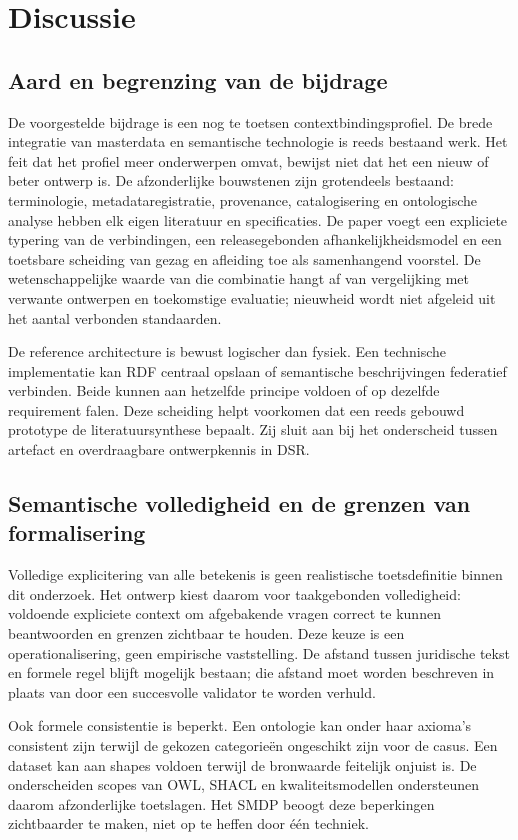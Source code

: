 \section{Discussie}
\subsection{Aard en begrenzing van de bijdrage}
De voorgestelde bijdrage is een nog te toetsen contextbindingsprofiel. De brede integratie van masterdata en semantische technologie is reeds bestaand werk. \citep{L18} Het feit dat het profiel meer onderwerpen omvat, bewijst niet dat het een nieuw of beter ontwerp is. De afzonderlijke bouwstenen zijn grotendeels bestaand: terminologie, metadata\-registratie, provenance, catalogisering en ontologische analyse hebben elk eigen literatuur en specificaties. \citep{S11,S08,S33,S47,L08} De paper voegt een expliciete typering van de verbindingen, een releasegebonden afhankelijkheidsmodel en een toetsbare scheiding van gezag en afleiding toe als samenhangend voorstel. De wetenschappelijke waarde van die combinatie hangt af van vergelijking met verwante ontwerpen en toekomstige evaluatie; nieuwheid wordt niet afgeleid uit het aantal verbonden standaarden.

De reference architecture is bewust logischer dan fysiek. Een technische implementatie kan RDF centraal opslaan of semantische beschrijvingen federatief verbinden. Beide kunnen aan hetzelfde principe voldoen of op dezelfde requirement falen. Deze scheiding helpt voorkomen dat een reeds gebouwd prototype de literatuursynthese bepaalt. Zij sluit aan bij het onderscheid tussen artefact en overdraagbare ontwerpkennis in DSR. \citep{L04}

\subsection{Semantische volledigheid en de grenzen van formalisering}
Volledige explicitering van alle betekenis is geen realistische toetsdefinitie binnen dit onderzoek. Het ontwerp kiest daarom voor taakgebonden volledigheid: voldoende expliciete context om afgebakende vragen correct te kunnen beantwoorden en grenzen zichtbaar te houden. Deze keuze is een operationalisering, geen empirische vaststelling. De afstand tussen juridische tekst en formele regel blijft mogelijk bestaan; die afstand moet worden beschreven in plaats van door een succesvolle validator te worden verhuld.

Ook formele consistentie is beperkt. Een ontologie kan onder haar axioma’s consistent zijn terwijl de gekozen categorieën ongeschikt zijn voor de casus. Een dataset kan aan shapes voldoen terwijl de bronwaarde feitelijk onjuist is. De onderscheiden scopes van OWL, SHACL en kwaliteitsmodellen ondersteunen daarom afzonderlijke toetslagen. \citep{S30,S32,S12} Het SMDP beoogt deze beperkingen zichtbaarder te maken, niet op te heffen door één techniek.

